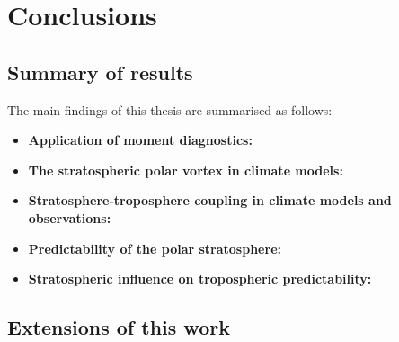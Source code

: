 \chapter{Conclusions}
\label{cha:conclusions}

\section{Summary of results}

The main findings of this thesis are summarised as follows: 
\begin{itemize}
\item\textbf{Application of moment diagnostics:}
\item\textbf{The stratospheric polar vortex in climate models:}
\item\textbf{Stratosphere-troposphere coupling in climate models and
    observations:}
\item\textbf{Predictability of the polar stratosphere:}
\item\textbf{Stratospheric influence on tropospheric predictability:}

\end{itemize}

\section{Extensions of this work}

